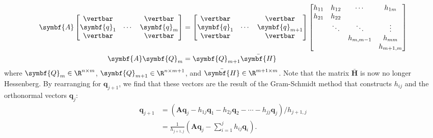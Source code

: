 \documentclass{article}
\begin{document}
\begin{align*}
    \symbf{A}
    \begin{bmatrix}
        \vertbar    &        & \vertbar    \\
        \symbf{q}_1 & \cdots & \symbf{q}_m \\
        \vertbar    &        & \vertbar    \\
    \end{bmatrix}
                          & =
    \begin{bmatrix}
        \vertbar    &        & \vertbar        \\
        \symbf{q}_1 & \cdots & \symbf{q}_{m+1} \\
        \vertbar    &        & \vertbar        \\
    \end{bmatrix}
    \begin{bmatrix}
        h_{11} & h_{12} & \cdots    & h_{1m}    \\
        h_{21} & h_{22} &           &           \\
               & \ddots & \ddots    & \vdots    \\
               &        & h_{m,m-1} & h_{mm}    \\
               &        &           & h_{m+1,m} \\
    \end{bmatrix}
    \\
    \symbf{A} \symbf{Q}_m & = \symbf{Q}_{m+1} \bar{\symbf{H}}
\end{align*}
where \(\symbf{Q}_m \in \R^{n \times m}\), \(\symbf{Q}_{m+1} \in \R^{n \times m+1}\),
and \(\bar{\symbf{H}} \in \R^{m+1 \times m}\). Note that the matrix
\(\bar{\symbf{H}}\) is now no longer Hessenberg. By rearranging for
\(\symbf{q}_{j+1}\), we find that these vectors are the result of the
Gram-Schmidt method that constructs \(h_{ij}\) and the orthonormal
vectors \(\symbf{q}_j\):
\begin{align*}
    \symbf{q}_{j+1} & = \left( \symbf{A} \symbf{q}_j - h_{1j} \symbf{q}_1 - h_{2j} \symbf{q}_2 - \cdots - h_{jj} \symbf{q}_j \right) / h_{j+1,j} \\
                    & = \frac{1}{h_{j+1,j}} \left( \symbf{A} \symbf{q}_j - \sum_{i=1}^j h_{ij} \symbf{q}_i \right).
\end{align*}
\end{document}
